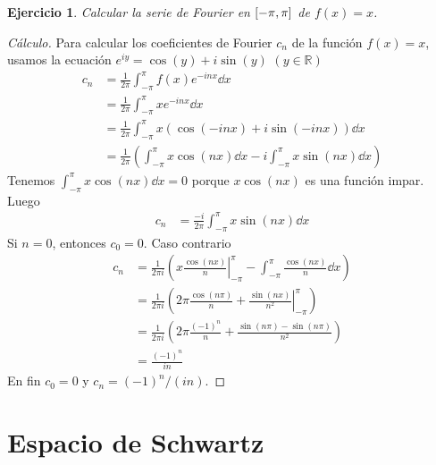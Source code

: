 \documentclass{article}
\newcommand{\realNumbers}{\mathbb{R}}
\newtheorem{exercise}{Ejercicio}
\newcommand{\leftOpenInterval}{\left]}
\newcommand{\rightOpenInterval}{\right[}
\newcommand{\leftClosedInterval}{\left[}
\newcommand{\rightClosedInterval}{\right]}
\newcommand{\interval}[3]{%
  \ifstrequal{#1}{oo}{%
    \leftOpenInterval #2, #3 \rightOpenInterval%
  }{%
    \ifstrequal{#1}{co}{%
      \leftClosedInterval #2, #3 \rightOpenInterval%
    }{%
      \ifstrequal{#1}{oc}{
        \leftOpenInterval #2, #3 \rightClosedInterval%
      }{%
        \ifstrequal{#1}{cc}{
          \leftClosedInterval #2, #3 \rightClosedInterval
        }{%
        }%
      }%
    }%
  }%
}
\theoremstyle{remark}
\begin{document}
\begin{exercise}
  Calcular la serie de Fourier en \(\interval{cc}{- \pi}{\pi}\) de \(f(x) = x\).
\end{exercise}
\begin{proof}[Cálculo]
  Para calcular los coeficientes de Fourier \(c_n\) de la función \(f(x) = x\), usamos la ecuación \(e^{i y} = \cos(y) + i \sin(y)\) \((y \in \realNumbers)\)
  \begin{align}
    c_n
    &=
    \frac{1}{2 \pi} \int_{- \pi}^{\pi} f(x) e^{- i n x} \dd x
    \\
    &=
    \frac{1}{2 \pi} \int_{- \pi}^{\pi} x e^{- i n x} \dd x
    \\
    &=
    \frac{1}{2 \pi} \int_{- \pi}^{\pi} x (\cos(- i n x) + i \sin(- i n x)) \dd x
    \\
    &=
    \frac{1}{2 \pi}
    \left(
      \int_{- \pi}^{\pi} x \cos(n x) \dd x
      -
      i \int_{- \pi}^{\pi} x \sin(n x) \dd x
    \right)
  \end{align}
  Tenemos \(\int_{- \pi}^{\pi} x \cos(n x) \dd x = 0\) porque \(x \cos(n x)\) es una función impar.
  Luego
  \begin{align}
    c_n
    &=
    \frac{- i}{2 \pi}
    \int_{- \pi}^{\pi} x \sin(n x) \dd x
  \end{align}
  Si \(n = 0\), entonces \(c_0 = 0\).
  Caso contrario
  \begin{align}
    c_n
    &=
    \frac{1}{2 \pi i}
    \left(
      \left. x \frac{\cos(n x)}{n} \right|_{- \pi}^{\pi}
      -
      \int_{- \pi}^{\pi} \frac{\cos(n x)}{n} \dd x
    \right)
    \\
    &=
    \frac{1}{2 \pi i}
    \left(
      2 \pi \frac{\cos(n \pi)}{n}
      +
      \left. \frac{\sin(n x)}{n^2} \right|_{- \pi}^{\pi}
    \right)
    \\
    &=
    \frac{1}{2 \pi i}
    \left(
      2 \pi \frac{(- 1)^n}{n}
      +
      \frac{\sin(n \pi) - \sin(n \pi)}{n^2}
    \right)
    \\
    &=
    \frac{(- 1)^n}{i n}
  \end{align}
  En fin \(c_0 = 0\) y \(c_n = (- 1)^n / (i n)\).
\end{proof}


\section{Espacio de Schwartz}
\end{document}
